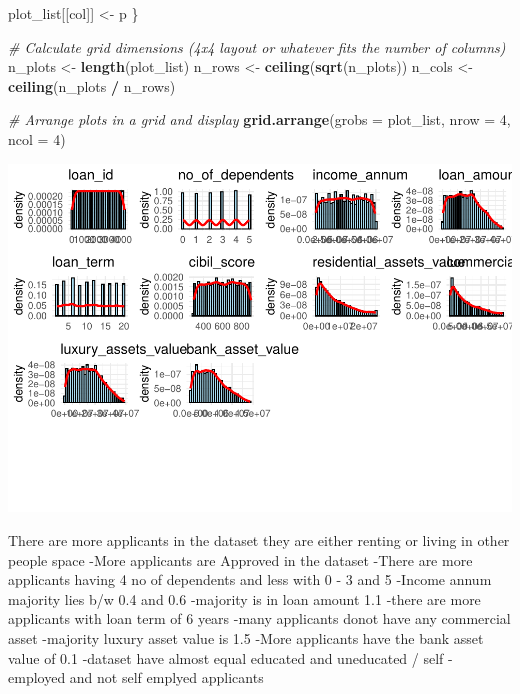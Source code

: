 \documentclass[
]{article}
\newenvironment{Shaded}{\begin{snugshade}}{\end{snugshade}}
\newcommand{\AttributeTok}[1]{\textcolor[rgb]{0.13,0.29,0.53}{#1}}
\newcommand{\CommentTok}[1]{\textcolor[rgb]{0.56,0.35,0.01}{\textit{#1}}}
\newcommand{\DecValTok}[1]{\textcolor[rgb]{0.00,0.00,0.81}{#1}}
\newcommand{\FunctionTok}[1]{\textcolor[rgb]{0.13,0.29,0.53}{\textbf{#1}}}
\newcommand{\NormalTok}[1]{#1}
\newcommand{\OtherTok}[1]{\textcolor[rgb]{0.56,0.35,0.01}{#1}}
\newcommand{\SpecialCharTok}[1]{\textcolor[rgb]{0.81,0.36,0.00}{\textbf{#1}}}
\begin{document}
\begin{Shaded}
\begin{Highlighting}[]
\NormalTok{  plot\_list[[col]] }\OtherTok{\textless{}{-}}\NormalTok{ p}
\NormalTok{\}}

\CommentTok{\# Calculate grid dimensions (4x4 layout or whatever fits the number of columns)}
\NormalTok{n\_plots }\OtherTok{\textless{}{-}} \FunctionTok{length}\NormalTok{(plot\_list)}
\NormalTok{n\_rows }\OtherTok{\textless{}{-}} \FunctionTok{ceiling}\NormalTok{(}\FunctionTok{sqrt}\NormalTok{(n\_plots))}
\NormalTok{n\_cols }\OtherTok{\textless{}{-}} \FunctionTok{ceiling}\NormalTok{(n\_plots }\SpecialCharTok{/}\NormalTok{ n\_rows)}

\CommentTok{\# Arrange plots in a grid and display}
\FunctionTok{grid.arrange}\NormalTok{(}\AttributeTok{grobs =}\NormalTok{ plot\_list, }\AttributeTok{nrow =} \DecValTok{4}\NormalTok{, }\AttributeTok{ncol =} \DecValTok{4}\NormalTok{)}
\end{Highlighting}
\end{Shaded}

\includegraphics{Loan_approval_files/figure-latex/unnamed-chunk-14-1.pdf}

There are more applicants in the dataset they are either renting or
living in other people space -More applicants are Approved in the
dataset -There are more applicants having 4 no of dependents and less
with 0 - 3 and 5 -Income annum majority lies b/w 0.4 and 0.6 -majority
is in loan amount 1.1 -there are more applicants with loan term of 6
years -many applicants donot have any commercial asset -majority luxury
asset value is 1.5 -More applicants have the bank asset value of 0.1
-dataset have almost equal educated and uneducated / self - employed and
not self emplyed applicants
\end{document}
